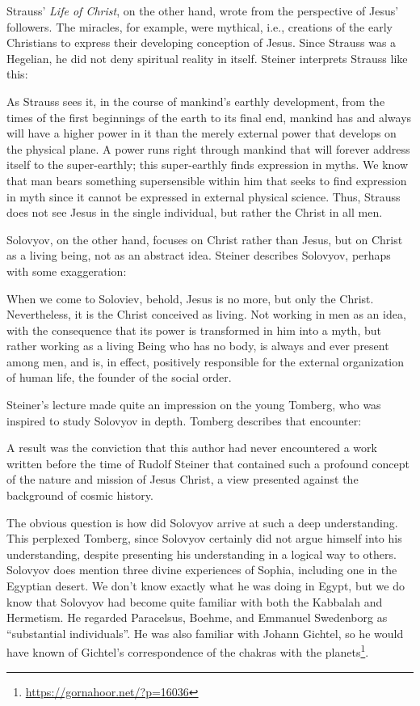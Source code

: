 Strauss' \emph{Life of Christ}, on the other hand, wrote from the perspective of Jesus' followers. The miracles, for example, were mythical, i.e., creations of the early Christians to express their developing conception of Jesus. Since Strauss was a Hegelian, he did not deny spiritual reality in itself. Steiner interprets Strauss like this:

\begin{quotex}
As Strauss sees it, in the course of mankind's earthly development, from the times of the first beginnings of the earth to its final end, mankind has and always will have a higher power in it than the merely external power that develops on the physical plane. A power runs right through mankind that will forever address itself to the super-earthly; this super-earthly finds expression in myths. We know that man bears something supersensible within him that seeks to find expression in myth since it cannot be expressed in external physical science. Thus, Strauss does not see Jesus in the single individual, but rather the Christ in all men.
\end{quotex}


Solovyov, on the other hand, focuses on Christ rather than Jesus, but on Christ as a living being, not as an abstract idea. Steiner describes Solovyov, perhaps with some exaggeration:

\begin{quotex}
When we come to Soloviev, behold, Jesus is no more, but only the Christ. Nevertheless, it is the Christ conceived as living. Not working in men as an idea, with the consequence that its power is transformed in him into a myth, but rather working as a living Being who has no body, is always and ever present among men, and is, in effect, positively responsible for the external organization of human life, the founder of the social order.
\end{quotex}


Steiner's lecture made quite an impression on the young Tomberg, who was inspired to study Solovyov in depth. Tomberg describes that encounter:

\begin{quotex}
A result was the conviction that this author had never encountered a work written before the time of Rudolf Steiner that contained such a profound concept of the nature and mission of Jesus Christ, a view presented against the background of cosmic history.
\end{quotex}


The obvious question is how did Solovyov arrive at such a deep understanding. This perplexed Tomberg, since Solovyov certainly did not argue himself into his understanding, despite presenting his understanding in a logical way to others. Solovyov does mention three divine experiences of Sophia, including one in the Egyptian desert. We don't know exactly what he was doing in Egypt, but we do know that Solovyov had become quite familiar with both the Kabbalah and Hermetism. He regarded Paracelsus, Boehme, and Emmanuel Swedenborg as ``substantial individuals''. He was also familiar with Johann Gichtel, so he would have known of Gichtel's correspondence of the chakras with the planets\footnote{\url{https://gornahoor.net/?p=16036}}.

